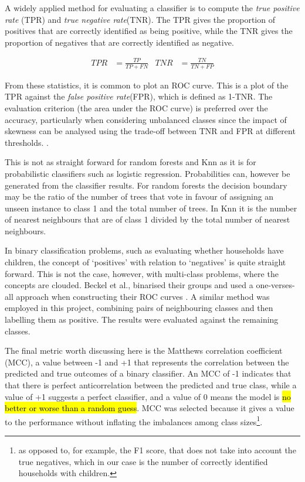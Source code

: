 A widely applied method for evaluating a classifier is to compute the \textit{true positive rate} (TPR) and \textit{true negative rate}(TNR). The TPR gives the proportion of positives that are correctly identified as being positive, while the TNR gives the proportion of negatives that are correctly identified as negative.

\begin{align*}
TPR&=\frac{TP}{TP+FN}   &   TNR&=\frac{TN}{TN+FP}   
\end{align*}

From these statistics, it is common to plot an ROC curve.  This is a plot of the TPR against the \textit{false positive rate}(FPR), which is defined as 1-TNR. The evaluation criterion (the area under the ROC curve) is preferred over the accuracy, particularly when considering unbalanced classes since the impact of skewness can be analysed using the trade-off between TNR and FPR at different thresholds. \cite{Waegeman}. 

This is not as straight forward for random forests and Knn as it is for probabilistic classifiers such as logistic regression. Probabilities can, however be generated from the classifier results. For random forests the decision boundary may be the ratio of the number of trees that vote in favour of assigning an unseen instance to class 1 and the total number of trees. In Knn it is the number of nearest neighbours that are of class 1 divided by the total number of nearest neighbours.

In binary classification problems, such as evaluating whether households have children, the concept of `positives' with relation to `negatives' is quite straight forward.  This is not the case, however, with multi-class problems, where the concepts are clouded.   Beckel et al., binarised their groups and used a one-verses-all approach when constructing their ROC curves \cite{Beckel_2,Beckel_3}.  A similar method was employed in this project, combining pairs of neighbouring classes and then labelling them as positive.  The results were evaluated against the remaining classes.

The final metric worth discussing here is the Matthews correlation coefficient (MCC), a value between -1 and +1 that represents the correlation between the predicted and true outcomes of a binary classifier. An MCC of -1 indicates that that there is perfect anticorrelation between the predicted and true class, while a value of +1 suggests a perfect classifier, and a value of 0 means the model is \hl{no better or worse than a random guess}. MCC was selected because it gives a value to the performance without inflating the imbalances among class sizes\footnote{as opposed to, for example, the F1 score, that does not take into account the true negatives, which in our case is the number of correctly identified households with children.}\cite{Powers}.

